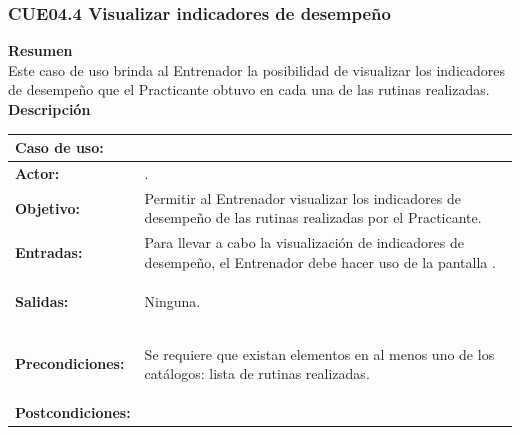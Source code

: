 \subsubsection{CUE04.4 Visualizar indicadores de desempeño}
\label{cu:CUE04.4}

\textbf{\textcolor[rgb]{0, 0, 0.545098}{Resumen}} \\

Este caso de uso brinda al Entrenador la posibilidad de visualizar los indicadores de desempeño que el Practicante obtuvo en cada una de las rutinas realizadas.\\

\textbf{\textcolor[rgb]{0, 0, 0.545098}{Descripción}}

\begin{table}[H]
\centering
\begin{tabular}{| l | p{12 cm} |}
\hline
\rowcolor[rgb]{0.529412, 0.807843, 0.980392} {\textbf{Caso de uso:}} & \hspace{4em}{\textbf{CUE04.4 Visualizar indicadores de desempeño}}\\
\hline
\textbf{Actor:} &  \nameref{act:Entrenador}. \\
\hline
\textbf{Objetivo:} & Permitir al Entrenador visualizar los indicadores de desempeño de las rutinas realizadas por el Practicante.\\
\hline
\textbf{Entradas:} & Para llevar a cabo la visualización de indicadores de desempeño, el Entrenador debe hacer uso de la pantalla \nameref{pant:IUE04.4}.\\
\hline
\textbf{Salidas:} & \vspace{-2mm}	%
					\begin{compactitem}
						\setlength\itemsep{-0.25em}
						\item Ninguna.	
					\end{compactitem}\\
\hline
\textbf{Precondiciones:} & 	\vspace{-2mm}	%
							\begin{compactitem}
								\setlength\itemsep{-0.25em}
								\item Se requiere que existan elementos en al menos uno de los catálogos: lista de rutinas realizadas.
							\end{compactitem}\\
\hline
\textbf{Postcondiciones:} & \vspace{-2mm}	%

\end{tabular}
\end{table}

